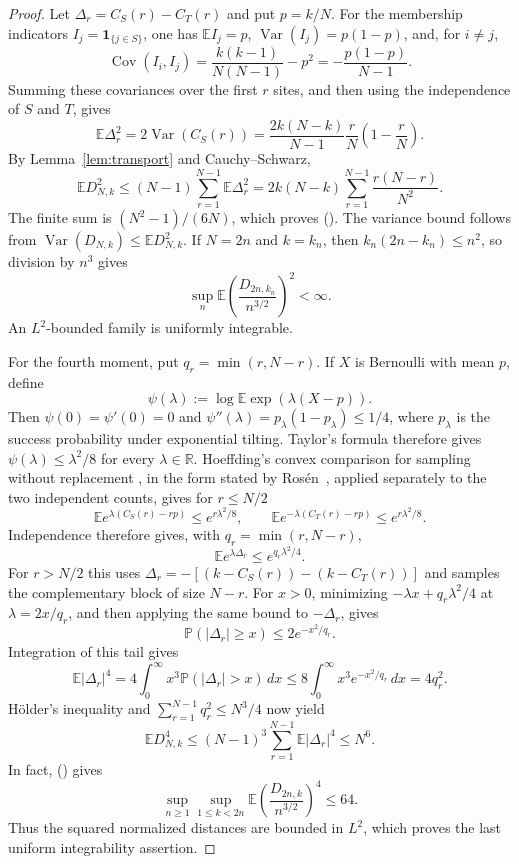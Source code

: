 \documentclass[twoside,10pt]{article}
\numberwithin{equation}{section}
\theoremstyle{slbody}
\theoremstyle{definition}
\theoremstyle{remark}
\newcommand{\E}{\mathbb{E}}
\newcommand{\Pp}{\mathbb{P}}
\newcommand{\Var}{\operatorname{Var}}
\newcommand{\1}{\mathbf{1}}
\renewcommand{\eqref}[1]{%
  \textup{{\normalfont(\oldstylenums{\ref{#1}}}\normalfont)}}
\begin{document}
\begin{proof}
Let $\Delta_r=C_S(r)-C_T(r)$ and put $p=k/N$.  For the membership
indicators $I_j=\1_{\{j\in S\}}$, one has
$\E I_j=p$, $\Var(I_j)=p(1-p)$, and, for $i\neq j$,
\[
 \operatorname{Cov}(I_i,I_j)
 =\frac{k(k-1)}{N(N-1)}-p^2
 =-\frac{p(1-p)}{N-1}.
\]
Summing these covariances over the first $r$ sites, and then using the
independence of $S$ and $T$, gives
\begin{equation}\label{eq:hypergeom-var}
 \E\Delta_r^2
 =2\Var(C_S(r))
 =\frac{2k(N-k)}{N-1}\frac rN\left(1-\frac rN\right).
\end{equation}
By Lemma~\ref{lem:transport} and Cauchy--Schwarz,
\[
 \E D_{N,k}^2
 \leq (N-1)\sum_{r=1}^{N-1}\E\Delta_r^2
 =2k(N-k)\sum_{r=1}^{N-1}\frac{r(N-r)}{N^2}.
\]
The finite sum is $(N^2-1)/(6N)$, which proves
\eqref{eq:second-moment-bound}.  The variance bound follows from
$\Var(D_{N,k})\leq\E D_{N,k}^2$.  If $N=2n$ and $k=k_n$, then
$k_n(2n-k_n)\leq n^2$, so division by $n^3$ gives
\[
 \sup_n \E\left(\frac{D_{2n,k_n}}{n^{3/2}}\right)^2<\infty.
\]
An $L^2$-bounded family is uniformly integrable.

For the fourth moment, put $q_r=\min(r,N-r)$.  If $X$ is Bernoulli with
mean $p$, define
\[
 \psi(\lambda):=\log\E\exp(\lambda(X-p)).
\]
Then
$\psi(0)=\psi'(0)=0$ and
$\psi''(\lambda)=p_\lambda(1-p_\lambda)\leq1/4$, where $p_\lambda$ is the
success probability under exponential tilting.  Taylor's formula therefore
gives $\psi(\lambda)\leq\lambda^2/8$ for every $\lambda\in\mathbb R$.
Hoeffding's convex comparison for sampling without replacement
\cite[Theorem~4]{Hoeffding}, in the form stated by
Ros\'en~\cite[Theorem~3.1]{Rosen}, applied separately to the two independent
counts, gives for $r\leq N/2$
\[
 \E e^{\lambda(C_S(r)-rp)}\leq e^{r\lambda^2/8},
 \qquad
 \E e^{-\lambda(C_T(r)-rp)}\leq e^{r\lambda^2/8}.
\]
Independence therefore gives, with $q_r=\min(r,N-r)$,
\[
 \E e^{\lambda\Delta_r}\leq e^{q_r\lambda^2/4}.
\]
For $r>N/2$ this uses
$\Delta_r=-[(k-C_S(r))-(k-C_T(r))]$ and samples the complementary block of
size $N-r$.  For $x>0$, minimizing
$-\lambda x+q_r\lambda^2/4$ at $\lambda=2x/q_r$, and then applying the same
bound to $-\Delta_r$, gives
\[
 \Pp(|\Delta_r|\geq x)\leq2e^{-x^2/q_r}.
\]
Integration of this tail gives
\[
 \E|\Delta_r|^4
 =4\int_0^\infty x^3\Pp(|\Delta_r|>x)\,dx
 \leq8\int_0^\infty x^3e^{-x^2/q_r}\,dx
 =4q_r^2.
\]
H\"older's inequality and $\sum_{r=1}^{N-1}q_r^2\leq N^3/4$ now yield
\[
 \E D_{N,k}^4
 \leq(N-1)^3\sum_{r=1}^{N-1}\E|\Delta_r|^4
 \leq N^6.
\]
In fact, \eqref{eq:fourth-moment-bound} gives
\[
 \sup_{n\geq1}\sup_{1\leq k<2n}
 \E\left(\frac{D_{2n,k}}{n^{3/2}}\right)^4\leq64.
\]
Thus the squared normalized distances are bounded in $L^2$, which proves the
last uniform integrability assertion.
\end{proof}
\end{document}
